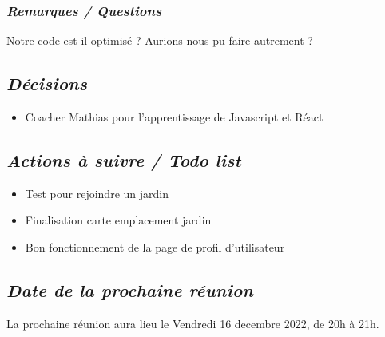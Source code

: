 \documentclass[french,a4paper]{article}
\begin{document}
\subsubsection*{\textit{Remarques / Questions}}
Notre code est il optimisé ? Aurions nous pu faire autrement ?

\subsection*{\textit{Décisions}}
\begin{itemize}
  \item Coacher Mathias pour l'apprentissage de Javascript et  Réact 
\end{itemize}

\subsection*{\textit{Actions à suivre / Todo list}}
\begin{itemize}
  \item Test pour rejoindre un jardin
  \item Finalisation carte emplacement jardin
  \item Bon fonctionnement de la page de profil d'utilisateur
\end{itemize}

\subsection*{\textit{Date de la prochaine réunion}}
La prochaine réunion aura lieu le Vendredi 16 decembre 2022, de 20h à 21h.
\end{document}
